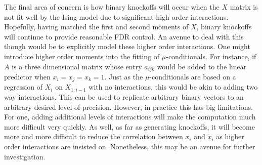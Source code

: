 \documentclass[11pt]{article}
\theoremstyle{definition}
\begin{document}
    The final area of concern is how binary knockoffs will occur when the $X$ matrix is not fit well by the Ising model due to significant high order interactions. Hopefully, having matched the first and second moments of $X$, binary knockoffs will continue to provide reasonable FDR control. An avenue to deal with this though would be to explicitly model these higher order interactions. One might introduce higher order moments into the fitting of $\mu$-conditionals. For instance, if $A$ is a three dimensional matrix whose entry $a_{ijk}$ would be added to the linear predictor when $x_i=x_j=x_k=1$. Just as the $\mu$-conditionals are based on a regression of $X_i$ on $X_{1:i-1}$ with no interactions, this would be akin to adding two way interactions. This can be used to replicate arbitrary binary vectors to an arbitrary desired level of precision. However, in practice this has big limitations. For one, adding additional levels of interactions will make the computation much more difficult very quickly. As well, as far as generating knockoffs, it will become more and more difficult to reduce the correlation between $x_i$ and $\tilde x_i$ as higher order interactions are insisted on. Nonetheless, this may be an avenue for further investigation.

    

\nocite{*}
\printbibliography[heading=bibintoc]
\end{document}
